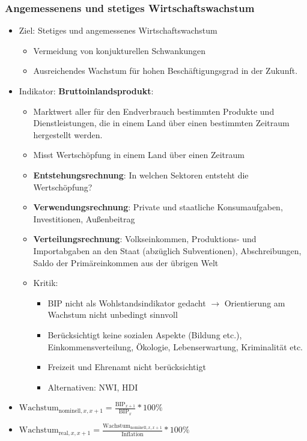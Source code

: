 \documentclass[titlepage,parskip=half]{scrartcl}
\begin{document}
\subsubsection{Angemessenens und stetiges Wirtschaftswachstum}
\begin{itemize}
    \item Ziel: Stetiges und angemessenes Wirtschaftswachstum
    \begin{itemize}
        \item Vermeidung von konjukturellen Schwankungen
        \item Ausreichendes Wachstum für hohen Beschäftigungsgrad in der Zukunft.
    \end{itemize}
    \item Indikator: \textbf{Bruttoinlandsprodukt}: 
    \begin{itemize}
        \item Marktwert aller für den Endverbrauch bestimmten Produkte und Dienstleistungen, die in einem Land über einen bestimmten Zeitraum hergestellt werden.
        \item Misst Wertschöpfung in einem Land über einen Zeitraum
        \item \textbf{Entstehungsrechnung}: In welchen Sektoren entsteht die Wertschöpfung?
        \item \textbf{Verwendungsrechnung}: Private und staatliche Konsumaufgaben, Investitionen, Außenbeitrag
        \item \textbf{Verteilungsrechnung}: Volkseinkommen, Produktions- und Importabgaben an den Staat (abzüglich Subventionen), Abschreibungen, Saldo der Primäreinkommen aus der übrigen Welt
        \item Kritik: 
        \begin{itemize}
            \item BIP nicht als Wohlstandsindikator gedacht $\rightarrow$ Orientierung am Wachstum nicht unbedingt sinnvoll
            \item Berücksichtigt keine sozialen Aspekte (Bildung etc.), Einkommensverteilung, Ökologie, Lebenserwartung, Kriminalität etc.
            \item Freizeit und Ehrenamt nicht berücksichtigt
            \item Alternativen: NWI, HDI
        \end{itemize}
    \end{itemize}
    \item $\mathrm{Wachstum}_{\mathrm{nominell},x,x+1} = \frac{\mathrm{BIP}_{x+1}}{\mathrm{BIP}_{x}} * 100\%$
    \item $\mathrm{Wachstum}_{\mathrm{real},x,x+1} = \frac{\mathrm{Wachstum}_{\mathrm{nominell},x,x+1}}{\mathrm{Inflation}} * 100\%$
\end{itemize}
\end{document}
